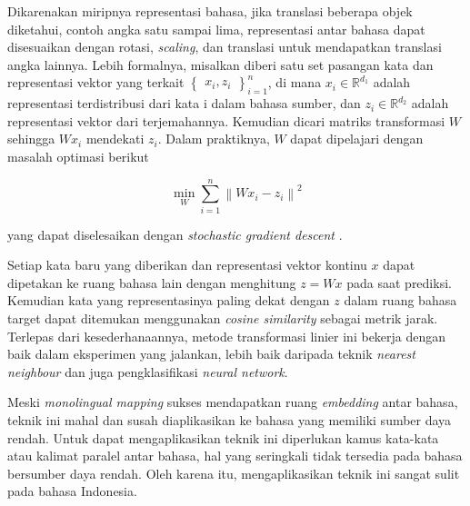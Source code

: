     Dikarenakan miripnya representasi bahasa, jika translasi beberapa objek diketahui, contoh angka satu sampai lima, representasi antar bahasa dapat disesuaikan dengan rotasi, \textit{scaling}, dan translasi untuk mendapatkan translasi angka lainnya. Lebih formalnya, misalkan diberi satu set pasangan kata dan representasi vektor yang terkait \begin{math} \begin{Bmatrix} {x_{i}, z_{i}} \end{Bmatrix}_{i=1}^{n} \end{math}, di mana \(x_{i}\in\mathbb{R}^{d_{1}}\) adalah representasi terdistribusi dari kata i dalam bahasa sumber, dan \(z_{i}\in\mathbb{R}^{d_{2}}\) adalah representasi vektor dari terjemahannya. Kemudian dicari matriks transformasi \( W\) sehingga \(W x_{i}\) mendekati \(z_{i}\). Dalam praktiknya, \(W\) dapat dipelajari dengan masalah optimasi berikut

    \begin{equation}
        \min_{W}\sum_{i=1}^{n}\left \| Wx_i-z_i \right \|^2
        \label{eq:2}
    \end{equation}

    yang dapat diselesaikan dengan \textit{stochastic gradient descent} \parencite{MikolovExploiting}.

    Setiap kata baru yang diberikan dan representasi vektor kontinu \(x\) dapat dipetakan ke ruang bahasa lain dengan menghitung \(z = W x\) pada saat prediksi. Kemudian kata yang representasinya paling dekat dengan \(z\) dalam ruang bahasa target dapat ditemukan menggunakan \textit{cosine similarity} sebagai metrik jarak. Terlepas dari kesederhanaannya, metode transformasi linier ini bekerja dengan baik dalam eksperimen yang \parencite{MikolovExploiting} jalankan, lebih baik daripada teknik \textit{nearest neighbour} dan juga pengklasifikasi \textit{neural network}.

    Meski \textit{monolingual mapping} sukses mendapatkan ruang \textit{embedding} antar bahasa, teknik ini mahal dan susah diaplikasikan ke bahasa yang memiliki sumber daya rendah. Untuk dapat mengaplikasikan teknik ini diperlukan kamus kata-kata atau kalimat paralel antar bahasa, hal yang seringkali tidak tersedia pada bahasa bersumber daya rendah. Oleh karena itu, mengaplikasikan teknik ini sangat sulit pada bahasa Indonesia.
    
